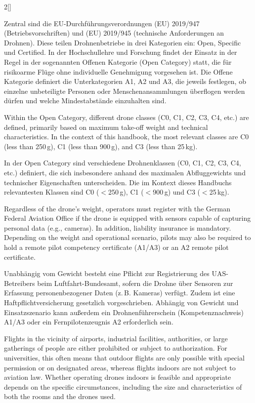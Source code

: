 \begin{paracol}{2}[]
\colger

Zentral sind die EU-Durchführungsverordnungen (EU) 2019/947 (Betriebsvorschriften) und (EU) 2019/945 (technische Anforderungen an Drohnen). Diese teilen Drohnenbetriebe in drei Kategorien ein: Open, Specific und Certified. In der Hochschullehre und Forschung findet der Einsatz in der Regel in der sogenannten Offenen Kategorie (Open Category) statt, die für risikoarme Flüge ohne individuelle Genehmigung vorgesehen ist. Die Offene Kategorie definiert die Unterkategorien A1, A2 und A3, die jeweils festlegen, ob einzelne unbeteiligte Personen oder Menschenansammlungen überflogen werden dürfen und welche Mindestabstände einzuhalten sind.

\coleng

Within the Open Category, different drone classes (C0, C1, C2, C3, C4, etc.) are defined, primarily based on maximum take-off weight and technical characteristics. In the context of this handbook, the most relevant classes are C0 (less than 250\,g), C1 (less than 900\,g), and C3 (less than 25\,kg).

\colger

In der Open Category sind verschiedene Drohnenklassen (C0, C1, C2, C3, C4, etc.) definiert, die sich insbesondere anhand des maximalen Abfluggewichts und technischer Eigenschaften unterscheiden. Die im Kontext dieses Handbuchs relevantesten Klassen sind C0 (\(<\)250\,g), C1 (\(<\)900\,g) und C3 (\(<\)25\,kg).

\coleng

Regardless of the drone’s weight, operators must register with the German Federal Aviation Office if the drone is equipped with sensors capable of capturing personal data (e.g., cameras). In addition, liability insurance is mandatory. Depending on the weight and operational scenario, pilots may also be required to hold a remote pilot competency certificate (A1/A3) or an A2 remote pilot certificate.

\colger

Unabhängig vom Gewicht besteht eine Pflicht zur Registrierung des UAS-Betreibers beim Luftfahrt-Bundesamt, sofern die Drohne über Sensoren zur Erfassung personenbezogener Daten (z.\,B. Kameras) verfügt. Zudem ist eine Haftpflichtversicherung gesetzlich vorgeschrieben. Abhängig von Gewicht und Einsatzszenario kann außerdem ein Drohnenführerschein (Kompetenznachweis) A1/A3 oder ein Fernpilotenzeugnis A2 erforderlich sein.

\coleng

Flights in the vicinity of airports, industrial facilities, authorities, or large gatherings of people are either prohibited or subject to authorization. For universities, this often means that outdoor flights are only possible with special permission or on designated areas, whereas flights indoors are not subject to aviation law. Whether operating drones indoors is feasible and appropriate depends on the specific circumstances, including the size and characteristics of both the rooms and the drones used.


\end{paracol}

